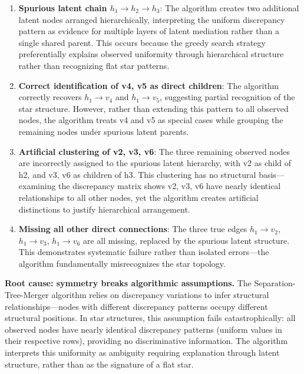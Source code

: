 \documentclass[11pt,a4paper]{article}
\numberwithin{equation}{section}
\begin{document}
\begin{enumerate}[label=(\arabic*)]
\item \textbf{Spurious latent chain $h_1 \to h_2 \to h_3$}: The algorithm creates two additional latent nodes arranged hierarchically, interpreting the uniform discrepancy pattern as evidence for multiple layers of latent mediation rather than a single shared parent. This occurs because the greedy search strategy preferentially explains observed uniformity through hierarchical structure rather than recognizing flat star patterns.

\item \textbf{Correct identification of v4, v5 as direct children}: The algorithm correctly recovers $h_1 \to v_4$ and $h_1 \to v_5$, suggesting partial recognition of the star structure. However, rather than extending this pattern to all observed nodes, the algorithm treats v4 and v5 as special cases while grouping the remaining nodes under spurious latent parents.

\item \textbf{Artificial clustering of v2, v3, v6}: The three remaining observed nodes are incorrectly assigned to the spurious latent hierarchy, with v2 as child of h2, and v3, v6 as children of h3. This clustering has no structural basis—examining the discrepancy matrix shows v2, v3, v6 have nearly identical relationships to all other nodes, yet the algorithm creates artificial distinctions to justify hierarchical arrangement.

\item \textbf{Missing all other direct connections}: The three true edges $h_1 \to v_2$, $h_1 \to v_3$, $h_1 \to v_6$ are all missing, replaced by the spurious latent structure. This demonstrates systematic failure rather than isolated errors—the algorithm fundamentally misrecognizes the star topology.
\end{enumerate}

\textbf{Root cause: symmetry breaks algorithmic assumptions.} The Separation-Tree-Merger algorithm relies on discrepancy variations to infer structural relationships—nodes with different discrepancy patterns occupy different structural positions. In star structures, this assumption fails catastrophically: all observed nodes have nearly identical discrepancy patterns (uniform values in their respective rows), providing no discriminative information. The algorithm interprets this uniformity as ambiguity requiring explanation through latent structure, rather than as the signature of a flat star.
\end{document}
